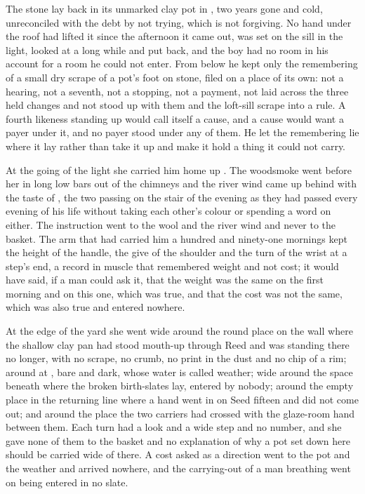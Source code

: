 \scenebreak

The stone lay back in its unmarked clay pot in , two years gone and cold, unreconciled with the debt by not trying, which is not forgiving. No hand under the roof had lifted it since the afternoon it came out, was set on the sill in the light, looked at a long while and put back, and the boy had no room in his account for a room he could not enter. From below he kept only the remembering of a small dry scrape of a pot's foot on stone, filed on a place of its own: not a hearing, not a seventh, not a stopping, not a payment, not laid across the three held changes and not stood up with them and the loft-sill scrape into a rule. A fourth likeness standing up would call itself a cause, and a cause would want a payer under it, and no payer stood under any of them. He let the remembering lie where it lay rather than take it up and make it hold a thing it could not carry.

At the going of the light she carried him home up . The woodsmoke went before her in long low bars out of the chimneys and the river wind came up behind with the taste of , the two passing on the stair of the evening as they had passed every evening of his life without taking each other's colour or spending a word on either. The instruction went to the wool and the river wind and never to the basket. The arm that had carried him a hundred and ninety-one mornings kept the height of the handle, the give of the shoulder and the turn of the wrist at a step's end, a record in muscle that remembered weight and not cost; it would have said, if a man could ask it, that the weight was the same on the first morning and on this one, which was true, and that the cost was not the same, which was also true and entered nowhere.

At the edge of the yard she went wide around the round place on the wall where the shallow clay pan had stood mouth-up through Reed and was standing there no longer, with no scrape, no crumb, no print in the dust and no chip of a rim; around  at , bare and dark, whose water is called weather; wide around the space beneath  where the broken birth-slates lay, entered by nobody; around the empty place in the returning line where a hand went in on Seed fifteen and did not come out; and around the place the two carriers had crossed with the glaze-room hand between them. Each turn had a look and a wide step and no number, and she gave none of them to the basket and no explanation of why a pot set down here should be carried wide of there. A cost asked as a direction went to the pot and the weather and arrived nowhere, and the carrying-out of a man breathing went on being entered in no slate.

